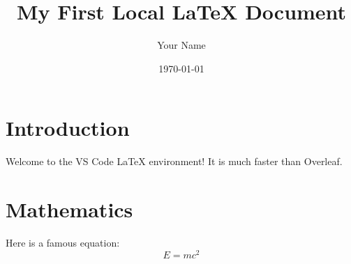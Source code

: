 \documentclass{article}
\title{My First Local LaTeX Document}
\author{Your Name}
\date{\today}
\begin{document}
\maketitle

\section{Introduction}
Welcome to the VS Code LaTeX environment! It is much faster than Overleaf.

\section{Mathematics}
Here is a famous equation:
\begin{equation}
    E = mc^2
\end{equation}
\end{document}
